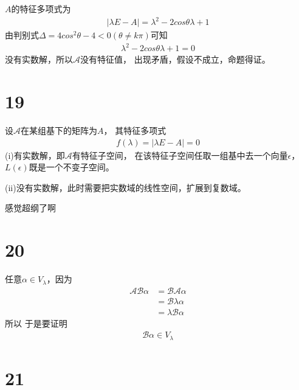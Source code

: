 \documentclass{article}
\begin{document}
$A$的特征多项式为
\begin{align*}
  |\lambda E - A| = \lambda^2 - 2cos \theta \lambda + 1
\end{align*}
由判别式$\Delta = 4 cos^2 \theta - 4 < 0 (\theta \neq k \pi)$可知
\begin{align*}
  \lambda^2 - 2cos \theta \lambda + 1 = 0
\end{align*}
没有实数解，所以$\mathscr{A}$没有特征值，
出现矛盾，假设不成立，命题得证。

\section*{19}

设$\mathscr{A}$在某组基下的矩阵为$A$，
其特征多项式
\begin{align*}
  f(\lambda) = |\lambda E - A| = 0
\end{align*}
(i)有实数解，即$\mathscr{A}$有特征子空间，
在该特征子空间任取一组基中去一个向量$\epsilon$，
$L(\epsilon)$既是一个不变子空间。

(ii)没有实数解，此时需要把实数域的线性空间，扩展到复数域。

感觉超纲了啊

\section*{20}

任意$\alpha \in V_{\lambda}$，因为
\begin{align*}
  \mathscr{A} \mathscr{B} \alpha
   & = \mathscr{B} \mathscr{A} \alpha \\
   & = \mathscr{B} \lambda \alpha     \\
   & = \lambda \mathscr{B} \alpha
\end{align*}
所以
于是要证明
\begin{align*}
  \mathscr{B} \alpha \in V_{\lambda}
\end{align*}

\section*{21}
\end{document}

